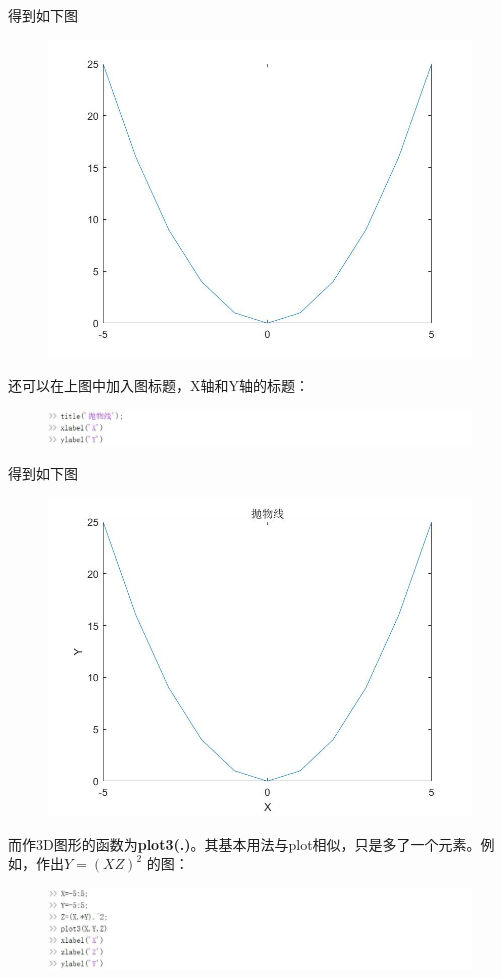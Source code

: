 \documentclass[cn,10pt,math=newtx,citestyle=gb7714-2015,bibstyle=gb7714-2015]{elegantbook}
\begin{document}
{{	得到如下图
	\begin{figure}[htbp!]
		\centering
		\includegraphics[width=0.8\linewidth]{FIG/XY.jpg}
		\centering
	\end{figure}
	
	还可以在上图中加入图标题，X轴和Y轴的标题：
	\begin{figure}[htbp!]
		\centering
		\includegraphics[width=0.8\linewidth]{FIG/title.jpg}
		\centering
	\end{figure}
	
	得到如下图
	\begin{figure}[htbp!]
		\centering
		\includegraphics[width=0.8\linewidth]{FIG/XY1.jpg}
		\centering
	\end{figure}
	
	而作3D图形的函数为\textbf{plot3(.)}。其基本用法与plot相似，只是多了一个元素。例如，作出$Y=(XZ)^2$ 的图：
	\begin{figure}[htbp!]
		\centering
		\includegraphics[width=0.8\linewidth]{FIG/3D.jpg}
		\centering
	\end{figure}
	
}}
\end{document}
